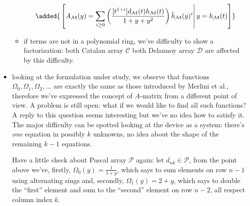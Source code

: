\documentclass[11pt,a4paper]{article} %
\begin{document}
\begin{itemize}
\begin{itemize}
            \begin{displaymath}
                \added{
                    \left.\left[
                        A_{\mathcal{M}}(y) = \sum_{i \geq0}{
                            \left(\frac{[t^{1+i}]d_{\mathcal{M}}(t)h_{\mathcal{M}}(t)}
                                {1+y+y^2}\right)
                            \hat{h}_{\mathcal{M}}(y)^{i}} 
                            \right| y = h_{\mathcal{M}}(t) \right]
                }
            \end{displaymath}

            \item if terms are not in a polynomial ring, we've difficulty to show a
            factorization: 
            {both Catalan array $\mathcal{C}$ both Delannoy array
            $\mathcal{D}$ are} affected by this difficulty.

            \end{itemize}
            
        \item looking at the formulation under study, we observe that functions
            $\Omega_{0}, \Omega_{1}, \Omega_{2}, \ldots$ are exactly the same
            as those introduced by Merlini et al., therefore we've expressed
            the concept of $A$-matrix from a different point of view. A problem
            is still open: what if we would like to find all such functions? A reply
            to this question seems interesting but we've no idea how to satisfy it.
            The major difficulty can be spotted looking at the device as a system:
            there's \emph{one} equation in possibly $k$ unknowns, no
            idea about the shape of the remaining $k-1$ equations.

            Have a little check about Pascal array $\mathcal{P}$ again:
            let $d_{nk}\in\mathcal{P}$, from the point above we've, firstly,
            $\Omega_{0}(y)=\frac{1}{1+y}$, which says to sum elements
             on row $n-1$ using alternating sings
            { and, secondly, $\Omega_{1}(y)=2+y$, 
            which says to double the ``first'' element and sum to the ``second'' element
            on row $n-2$}, all respect column index $k$. 
            

\end{itemize}
\end{document}
